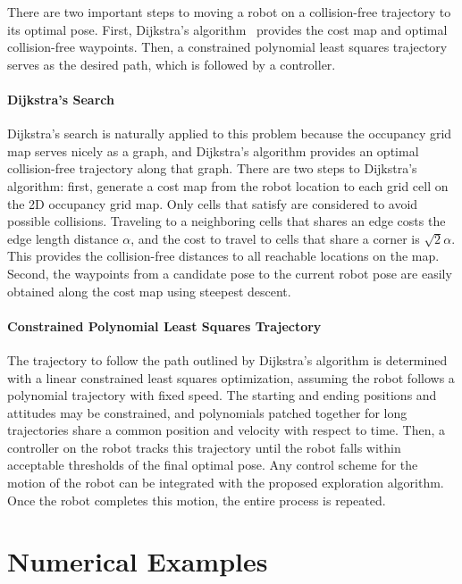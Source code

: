 There are two important steps to moving a robot on a collision-free trajectory to its optimal pose. First, Dijkstra's algorithm~\cite{Dij59,Dij11} provides the cost map and optimal collision-free waypoints. Then, a constrained polynomial least squares trajectory serves as the desired path, which is followed by a controller.

\paragraph{Dijkstra's Search}

Dijkstra's search is naturally applied to this problem because the occupancy grid map serves nicely as a graph, and Dijkstra's algorithm provides an optimal collision-free trajectory along that graph. There are two steps to Dijkstra's algorithm: first, generate a cost map from the robot location to each grid cell on the 2D occupancy grid map. Only cells that satisfy  are considered to avoid possible collisions. Traveling to a neighboring cells that shares an edge costs the edge length distance $\alpha$, and the cost to travel to cells that share a corner is $\sqrt{2}\alpha$. This provides the collision-free distances to all reachable locations on the map. Second, the waypoints from a candidate pose to the current robot pose are easily obtained along the cost map using steepest descent. 


\paragraph{Constrained Polynomial Least Squares Trajectory} The trajectory to follow the path outlined by Dijkstra's algorithm is determined with a linear constrained least squares optimization, assuming the robot follows a polynomial trajectory with fixed speed. The starting and ending positions and attitudes may be constrained, and polynomials patched together for long trajectories share a common position and velocity with respect to time. Then, a controller on the robot tracks this trajectory until the robot falls within acceptable thresholds of the final optimal pose. Any control scheme for the motion of the robot can be integrated with the proposed exploration algorithm. Once the robot completes this motion, the entire process is repeated. 

\section{Numerical Examples}
\label{sec:Ae2DNumExamples}

